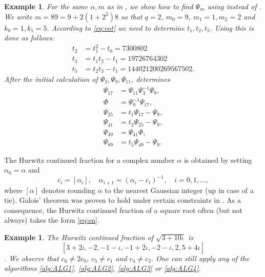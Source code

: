 \documentclass[a4paper,fleqn]{cas-sc}
\newtheorem{example}[theorem]{Example}
\begin{document}
\begin{example}
For the same $\alpha,m$ as in , we show how to find $\Psi_m$ using  instead of . We write $m=89=9+2(1+2^2)8$ so that $q=2$, $m_0=9$, $m_1=1,m_2=2$ and $k_0=1,k_1=5$. According to \cref{eq:vot} we need to determine $t_1,t_2,t_5$. Using  this is done as follows:
\begin{align*}
t_{2} &= t_{1}^{2}-t_{0} = 7300802 \\
t_{3} &= t_{1} t_{2}-t_{1} = 19726764302 \\
t_{5} &= t_{2} t_{3}-t_{1} = 144021200269567502.
\end{align*}
After the initial calculation of $\Psi_3,\Psi_9,\Psi_{11}$,  determines
\begin{align*}
\Psi_{17}&=\Psi_{11}\Psi_3^{-1}\Psi_9,\\ \Phi&=\Psi_9^{-1}\Psi_{17},\\
\Psi_{25}&=t_1\Psi_{17}-\Psi_9,\\
\Psi_{41}&=t_2\Psi_{25}-\Psi_9,\\
\Psi_{49}&=\Psi_{41}\Phi,\\
\Psi_{89}&=t_5\Psi_{49}-\Psi_9.
\end{align*}
\end{example}

The Hurwitz continued fraction for a complex number $\alpha$ is obtained by setting $\alpha_0=\alpha$ and
\begin{equation} \label{Alg}
c_i=\left[ \alpha_i \right], \quad \alpha_{i+1}=\left(\alpha_i-c_i \right)^{-1}, \quad i=0,1,\ldots,
\end{equation}
where $\left[ \alpha \right]$ denotes rounding $\alpha$ to the nearest Gaussian integer (up in case of a tie). Galois' theorem was proven to hold under certain constraints in \cite{GGR}. As a consequence, the Hurwitz continued fraction of a square root often (but not always) takes the form \eqref{eq:sn}.

\begin{example}
The Hurwitz continued fraction of $\sqrt{3+10\iota}$ is
\[
[3+2 \iota, \overline{-2, -1-\iota, -1+2 \iota, -2-\iota, 2, 5+4 \iota}]
\].
We observe that $c_6\neq 2c_0$, $c_5\neq c_1$ and $c_4\neq c_2$. One can still apply any of the algorithms \ref{alg:ALG1}, \ref{alg:ALG2}, \ref{alg:ALG3} or \ref{alg:ALG4}.
\end{example}
\end{document}
